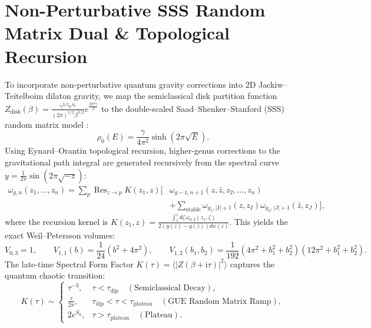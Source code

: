 \documentclass[11pt,a4paper]{article}
\theoremstyle{plain}
\theoremstyle{definition}
\begin{document}
\section{Non-Perturbative SSS Random Matrix Dual \& Topological Recursion}
To incorporate non-perturbative quantum gravity corrections into 2D Jackiw--Teitelboim dilaton gravity, we map the semiclassical disk partition function $Z_{\mathrm{disk}}(\beta) = \frac{\gamma^{3/2} e^{S_0}}{(2\pi)^{1/2} \beta^{3/2}} e^{\frac{2\pi^2 \gamma}{\beta}}$ to the double-scaled Saad--Shenker--Stanford (SSS) random matrix model \cite{SaadShenkerStanford2019}:
\begin{equation}
\rho_0(E) = \frac{\gamma}{4\pi^2} \sinh\left(2\pi \sqrt{E}\right).
\end{equation}
Using Eynard--Orantin topological recursion, higher-genus corrections to the gravitational path integral are generated recursively from the spectral curve $y = \frac{1}{2\pi} \sin(2\pi \sqrt{-z})$:
\begin{equation}
\begin{split}
\omega_{g, n}(z_1, \dots, z_n) = \sum_{p} \operatorname{Res}_{z \to p} K(z_1, z) \biggl[ &\omega_{g-1, n+1}(z, \bar{z}, z_2, \dots, z_n) \\
&+ \sum_{\text{stable}} \omega_{g_1, |I|+1}(z, z_I) \omega_{g_2, |J|+1}(\bar{z}, z_J) \biggr],
\end{split}
\end{equation}
where the recursion kernel is $K(z_1, z) = \frac{\int_{\bar{z}}^z d\zeta \, \omega_{0, 2}(z_1, \zeta)}{2(y(z) - y(\bar{z})) dx(z)}$. This yields the exact Weil--Petersson volumes:
\begin{equation}
V_{0, 3} = 1, \qquad V_{1, 1}(b) = \frac{1}{24}\left(b^2 + 4\pi^2\right), \qquad V_{1, 2}(b_1, b_2) = \frac{1}{192}\left(4\pi^2 + b_1^2 + b_2^2\right)\left(12\pi^2 + b_1^2 + b_2^2\right).
\end{equation}
The late-time Spectral Form Factor $K(\tau) = \langle |Z(\beta + \mathrm{i}\tau)|^2 \rangle$ captures the quantum chaotic transition:
\begin{equation}
K(\tau) \sim \begin{cases}
\tau^{-3}, & \tau < \tau_{\mathrm{dip}} \quad (\text{Semiclassical Decay}), \\
\frac{\tau}{2\pi}, & \tau_{\mathrm{dip}} < \tau < \tau_{\mathrm{plateau}} \quad (\text{GUE Random Matrix Ramp}), \\
2 e^{S_0}, & \tau > \tau_{\mathrm{plateau}} \quad (\text{Plateau}).
\end{cases}
\end{equation}
\end{document}
